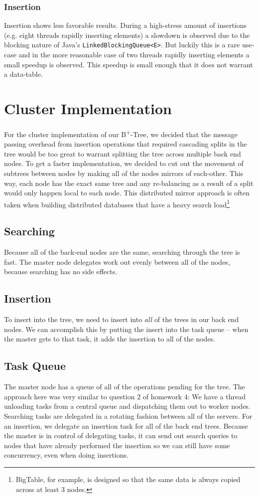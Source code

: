 \documentclass[conference]{IEEEtran}
\begin{document}
\subsubsection{Insertion}
Insertion shows less favorable results. During a high-stress amount of 
insertions (e.g. eight threads rapidly inserting elements) a slowdown is 
observed due to the blocking nature of Java's \texttt{LinkedBlockingQueue<E>}. But
luckily this is a rare use-case and in the more reasonable case of two threads 
rapidly inserting elements a small speedup is observed. This speedup is small 
enough that it does not warrant a data-table.

\section{Cluster Implementation}
For the cluster implementation of our B\textsuperscript{+}-Tree, we decided that
the message passing overhead from insertion operations that required cascading
splits in the tree would be too great to warrant splitting the tree across
multiple back end nodes. To get a faster implementation, we decided to cut out
the movement of subtrees between nodes by making all of the nodes mirrors of
each-other. This way, each node has the exact same tree and any re-balancing as
a result of a split would only happen local to each node. This distributed
mirror approach is often taken when building distributed databases that have a
heavy search load\footnote{BigTable, for example, is designed so that the
same data is always copied across at least 3 nodes.}

\subsection{Searching}
Because all of the back-end nodes are the same, searching through the tree is
fast. The master node delegates work out evenly between all of the nodes,
because searching has no side effects.

\subsection{Insertion}
To insert into the tree, we need to insert into {\em all} of the trees in our
back end nodes. We can accomplish this by putting the insert into the task queue
\--- when the master gets to that task, it adds the insertion to all of the nodes.

\subsection{Task Queue}
The master node has a queue of all of the operations pending for the tree. The
approach here was very similar to question 2 of homework 4: We have a thread
unloading tasks from a central queue and dispatching them out to worker nodes.
Searching tasks are delegated in a rotating fashion between all of the servers.
For an insertion, we delegate an insertion task for all of the back end trees.
Because the master is in control of delegating tasks, it can send out search
queries to nodes that have already performed the insertion so we can still have
some concurrency, even when doing insertions.
\end{document}
